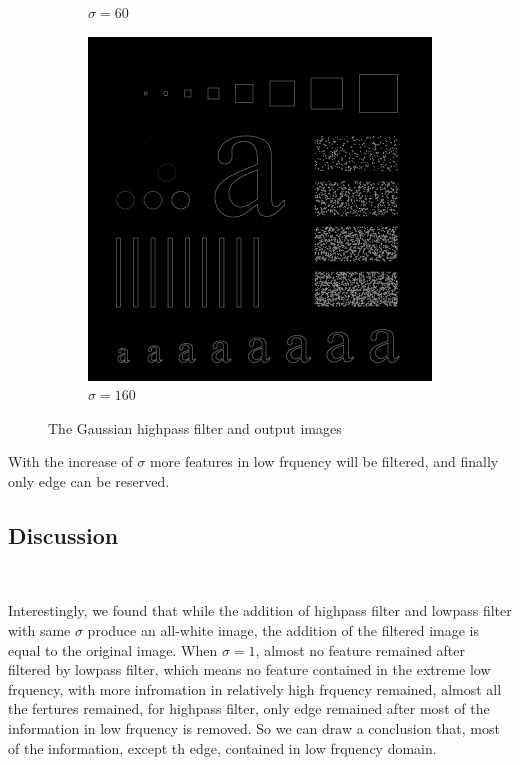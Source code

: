 \documentclass[
	12pt, %
]{style/fphw}
\begin{document}
\begin{figure}[H]
\begin{subfigure}[b]{.3\textwidth}
         \caption{$\sigma=60$}
         \label{Q5_2_highpass_60}
     \end{subfigure}
     \hfill
     \begin{subfigure}[b]{.3\textwidth}
         \centering
         \includegraphics[width=\textwidth]{Q5_2_highpass_160.png}
         \caption{$\sigma=160$}
         \label{Q5_2_highpass_160}
     \end{subfigure}
     
    \caption{The Gaussian highpass filter and output images}
    \label{Gaussian highpass filter}
\end{figure}

With the increase of $\sigma$ more features in low frquency will be filtered, and finally only edge can be reserved.

\subsection*{Discussion} \

Interestingly, we found that while the addition of highpass filter and lowpass filter with same $\sigma$ produce an all-white image, the addition of the filtered image is equal to the original image. When $\sigma=1$, almost no feature remained after filtered by lowpass filter, which means no feature contained in the extreme low frquency, with more infromation in relatively high frquency remained, almost all the fertures remained, for highpass filter, only edge remained after most of the information in low frquency is removed. So we can draw a conclusion that, most of the information, except th edge, contained in low frquency domain.
\end{document}
